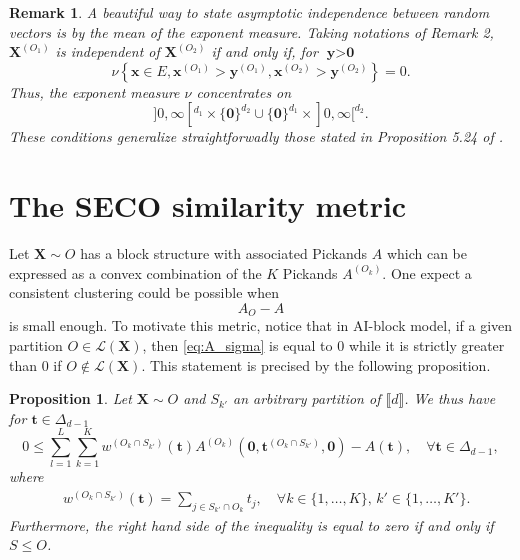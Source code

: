 \documentclass[11pt]{article}
\newtheorem{proposition}{Proposition}
\newtheorem{remark}{Remark}
\begin{document}
	\begin{remark}
		A beautiful way to state asymptotic independence between random vectors is by the mean of the exponent measure. Taking notations of Remark 2, $\textbf{X}^{(O_1)}$ is independent of $\textbf{X}^{(O_2)}$ if and only if, for $\textbf{y} > \textbf{0}$
		\begin{equation*}
			\nu \left\{ \textbf{x} \in E, \textbf{x}^{(O_1)} > \textbf{y}^{(O_1)}, \textbf{x}^{(O_2)} > \textbf{y}^{(O_2)}\right\} = 0.
		\end{equation*}
		Thus, the exponent measure $\nu$ concentrates on
		\begin{equation*}
			]0, \infty[^{d_1} \times \{\textbf{0}\}^{d_2} \cup \{ \textbf{0} \}^{d_1} \times ]0, \infty[^{d_2}.
		\end{equation*}
		These conditions generalize straightforwadly those stated in Proposition 5.24 of \cite{resnick2008extreme}.
	\end{remark}
	
	\section{The SECO similarity metric}
	\label{sec:SECO}
		Let $\textbf{X} \sim O$ has a block structure with associated Pickands $A$ which can be expressed as a convex combination of the $K$ Pickands $A^{(O_k)}$. One expect a consistent clustering could be possible when
		\begin{equation}
		\label{eq:A_sigma}
			A_{O} - A
		\end{equation}
		is small enough. To motivate this metric, notice that in AI-block model, if a given partition $O \in \mathcal{L}(\textbf{X})$, then \eqref{eq:A_sigma} is equal to $0$ while it is strictly greater than $0$ if $O \notin \mathcal{L}(\textbf{X})$. This statement is precised by the following proposition.
		
		\begin{proposition}
		\label{prop:oracle}
		Let $\textbf{X} \sim O$ and $S_{k'}$ an arbitrary partition of $\llbracket d \rrbracket$. We thus have for $\textbf{t} \in \Delta_{d-1}$
		\begin{equation}
			\label{eq:oracle}
			0 \leq \sum_{l=1}^L \sum_{k=1}^K w^{(O_k \cap S_{k'})}(\textbf{t}) A^{(O_k)}(\textbf{0},\textbf{t}^{(O_k \cap S_{k'})}, \textbf{0}) - A(\textbf{t}), \quad \forall \textbf{t} \in \Delta_{d-1},
		\end{equation}
		where
		\begin{align*}
			&w^{(O_k \cap S_{k'})}(\textbf{t}) = \sum_{j \in S_{k'} \cap O_{k}} t_j, \quad \forall k \in \{1,\dots, K \}, \, k' \in \{1,\dots, K'\}.
		\end{align*}
		Furthermore, the right hand side of the inequality is equal to zero if and only if $S \leq O$.
	\end{proposition}
	
\end{document}
